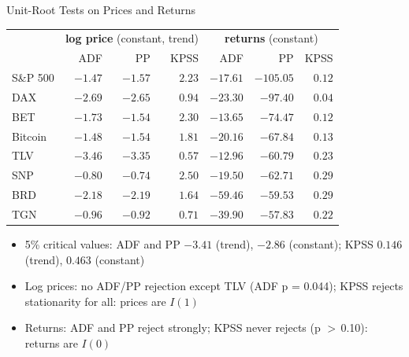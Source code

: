 \begin{frame}{Unit-Root Tests on Prices and Returns}
\itemsize{\footnotesize}
\begin{center}
\scriptsize
\begin{tabular}{lrrrrrr}
\toprule
& \multicolumn{3}{c}{\textbf{log price} (constant, trend)} & \multicolumn{3}{c}{\textbf{returns} (constant)} \\ & ADF & PP & KPSS & ADF & PP & KPSS \\
\midrule
S\&P 500 & ${-1.47}$ & ${-1.57}$ & ${2.23}$ & ${-17.61}$ & ${-105.05}$ & ${0.12}$ \\
DAX & ${-2.69}$ & ${-2.65}$ & ${0.94}$ & ${-23.30}$ & ${-97.40}$ & ${0.04}$ \\
BET & ${-1.73}$ & ${-1.54}$ & ${2.30}$ & ${-13.65}$ & ${-74.47}$ & ${0.12}$ \\
Bitcoin & ${-1.48}$ & ${-1.54}$ & ${1.81}$ & ${-20.16}$ & ${-67.84}$ & ${0.13}$ \\
TLV & ${-3.46}$ & ${-3.35}$ & ${0.57}$ & ${-12.96}$ & ${-60.79}$ & ${0.23}$ \\
SNP & ${-0.80}$ & ${-0.74}$ & ${2.50}$ & ${-19.50}$ & ${-62.71}$ & ${0.29}$ \\
BRD & ${-2.18}$ & ${-2.19}$ & ${1.64}$ & ${-59.46}$ & ${-59.53}$ & ${0.29}$ \\
TGN & ${-0.96}$ & ${-0.92}$ & ${0.71}$ & ${-39.90}$ & ${-57.83}$ & ${0.22}$ \\
\bottomrule
\end{tabular}
\end{center}
\begin{itemize}
    \item 5\% critical values: ADF and PP $-3.41$ (trend), $-2.86$ (constant); KPSS $0.146$ (trend), $0.463$ (constant)
    \item Log prices: no ADF/PP rejection except TLV (ADF p = 0.044); KPSS rejects stationarity for all: prices are $I(1)$
    \item Returns: ADF and PP reject strongly; KPSS never rejects (p $>$\,0.10): returns are $I(0)$
\end{itemize}
\end{frame}

